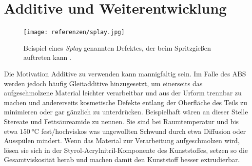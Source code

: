     \section{Additive und Weiterentwicklung}
        \begin{figure}%
            \centering
            \vspace{-.8\baselineskip}
            \texttt{[image: referenzen/splay.jpg]}%
            \caption[Beispiel eines Defektes beim Spritzgießen]{Beispiel eines \textit{Splay} genannten Defektes, der beim Spritzgießen auftreten kann \cite{defects.of.casting.plastic.products.2018}.}%
            \label{fig:splay}%
        \end{figure}
        Die Motivation Additive zu verwenden kann mannigfaltig sein. Im Falle des ABS werden jedoch häufig Gleitadditive
        hinzugesetzt, um einerseits das aufgeschmolzene Material leichter verarbeitbar und aus der Urform trennbar zu machen
        und andererseits kosmetische Defekte entlang der Oberfläche des Teils zu minimieren oder gar gänzlich zu unterdrücken.
        Beispielhaft wären an dieser Stelle Stereate und Fettsäureamide zu nennen. Sie sind bei Raumtemperatur und bis etwa \(\SI{150}{\celsius}\)
        fest/hochviskos was ungewollten Schwund durch etwa Diffusion oder Ausspülen mindert. Wenn das Material zur Verarbeitung
        aufgeschmolzen wird, lösen sie sich in der Styrol-Acrylnitril-Komponente des Kunststoffes, setzen so die Gesamtviskosität
        herab und machen damit den Kunststoff besser extrudierbar.
        
